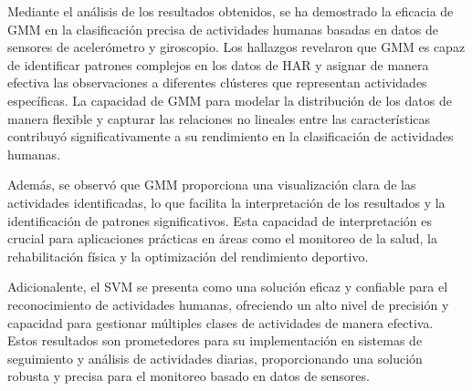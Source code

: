 \documentclass{esannV2}
\begin{document}
Mediante el análisis de los resultados obtenidos, se ha demostrado la eficacia de GMM en la clasificación precisa de actividades humanas basadas en datos de sensores de acelerómetro y giroscopio. Los hallazgos revelaron que GMM es capaz de identificar patrones complejos en los datos de HAR y asignar de manera efectiva las observaciones a diferentes clústeres que representan actividades específicas. La capacidad de GMM para modelar la distribución de los datos de manera flexible y capturar las relaciones no lineales entre las características contribuyó significativamente a su rendimiento en la clasificación de actividades humanas.

Además, se observó que GMM proporciona una visualización clara de las actividades identificadas, lo que facilita la interpretación de los resultados y la identificación de patrones significativos. Esta capacidad de interpretación es crucial para aplicaciones prácticas en áreas como el monitoreo de la salud, la rehabilitación física y la optimización del rendimiento deportivo.

Adicionalente, el SVM se presenta como una solución eficaz y confiable para el reconocimiento de actividades humanas, ofreciendo un alto nivel de precisión y capacidad para gestionar múltiples clases de actividades de manera efectiva. Estos resultados son prometedores para su implementación en sistemas de seguimiento y análisis de actividades diarias, proporcionando una solución robusta y precisa para el monitoreo basado en datos de sensores.



\begin{footnotesize}









%
%

\end{footnotesize}

\end{document}
